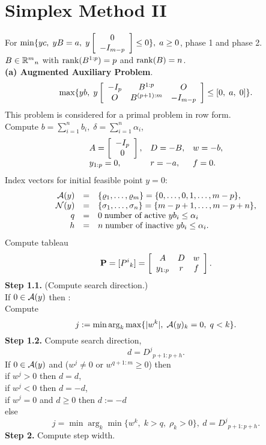 \section{Simplex Method II}
For $\min \{yc, \; yB = a, \; y\ba{[}{c}0\\ -I_{m-p}\ea{]} \leq 0\},
\; a \geq 0$, phase 1 and phase 2.\\
$B \in \Bbb{R}^m{}_n$ with $\rank (B^{1:p}) = p$ and
$\rank (B) = n$.\\
{\bf (a) Augmented Auxiliary Problem}.
%
\[
\max\{yb, \; y\ba{[}{ccc} -I_p & B^{1:p} & O \\O  & B^{(p+1):m} & -I_{m-p}
\ea{]} \leq [0, \; a, \; 0]\}.
\]
This problem is considered for a primal problem in row form.\\
%
Compute  $ b = \sum_{i=1}^nb_i, \; \delta  = \sum_{i=1}^n\alpha _i$,
%
\[
\ba{.}{lll}
A = \ba{[}{c}-I_p \\ 0\ea{]}, & D = - B, &w = - b,\\
y_{1:p} = 0,  &   r = - a, & f = 0.
\ea{.}
\]
Index vectors for initial feasible point $y = 0$:
\[ \ba{.} {rclcl}
\A(y) &=&  \{\rho _1,\ldots,\rho _m\} = \{0, \ldots ,0,1,\ldots
,m-p\},\\
\N(y) &=&  \{\sigma_1, \ldots,\sigma_n\} = \{m-p+1, \ldots, m-p+n\},\\
  q   &=&  0 \; \mbox{number of active $yb_i \leq \alpha _i$}\\
  h   &=&  n \; \mbox{number of inactive $yb_i \leq \alpha _i$}.
\ea{.}
\]
Compute tableau
\[
{\bf P} = [P^i{}_k] = \ba{[}{ccc} A & D & w\\ y_{1:p} & r & f\ea{]}.
\]
{\bf Step 1.1.} (Compute search direction.)\\
If $0 \in \A(y)$ then :\\
Compute
\[
j := \min \arg_k \max \{|w^k|, \; \A(y)_k = 0, \; q < k\}.
\]
{\bf Step 1.2.} Compute search direction,
\[
d = D^j{}_{p+1:p+h}.
\]
If $0 \in \A(y)$ and ($w^j \neq 0$ or $w^{q+1:m} \geq 0$) then\\
\hspace*{1cm} if $w^j > 0$ then $d = d$,\\
\hspace*{1cm} if $w^j < 0$ then $d = - d$,\\
\hspace*{1cm} if $w^j = 0$ and $d \geq 0$ then $d := -d$\\
else
\[
j = \min \arg_k \min \{w^k, \; k > q, \; \rho _k > 0\}, \:
d = D^j{}_{p+1:p+h}.
\]
{\bf Step 2.} Compute step width.\\
